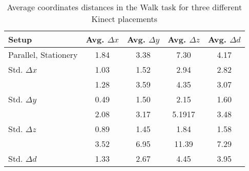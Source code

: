 \begin{table}[!htb]
\centering
\begin{tabularx}{1.0\columnwidth}{||X c c c c||} 
 \hline
 \textbf{Setup} & Avg. $\Delta x$ & Avg. $\Delta y$ & Avg. $\Delta z$ & Avg. $\Delta d$ \\ [0.5ex] 
 \hline\hline
Parallel, Stationery & 1.84 & 3.38 & 7.30 & 4.17 \\
 \hline
 Std. $\Delta x$ & 1.03 & 1.52 & 2.94 & 2.82 \\
 \hline
  & 1.28 & 3.59 & 4.35 & 3.07 \\
 \hline
 Std. $\Delta y$ & 0.49 & 1.50 & 2.15 & 1.60 \\
 \hline
  & 2.08 & 3.17 & 5.1917 & 3.48 \\
 \hline
 Std. $\Delta z$ & 0.89 & 1.45 & 1.84 & 1.58 \\
 \hline
  & 3.52 & 6.95 & 11.39 & 7.29 \\
 \hline
 Std. $\Delta d$ & 1.33 & 2.67 & 4.45 & 3.95 \\
 \hline
\end{tabularx}
\caption{Average coordinates distances in the Walk task for three different Kinect placements}
\label{table:overall_coordinates_values}
\end{table}
\FloatBarrier

